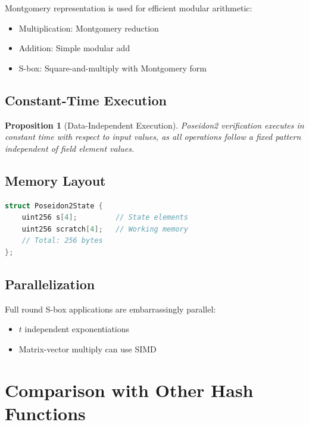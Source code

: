 \documentclass[11pt,a4paper]{article}
\newtheorem{proposition}{Proposition}
\begin{document}
Montgomery representation is used for efficient modular arithmetic:

\begin{itemize}
    \item Multiplication: Montgomery reduction
    \item Addition: Simple modular add
    \item S-box: Square-and-multiply with Montgomery form
\end{itemize}

\subsection{Constant-Time Execution}

\begin{proposition}[Data-Independent Execution]
Poseidon2 verification executes in constant time with respect to input values, as all operations follow a fixed pattern independent of field element values.
\end{proposition}

\subsection{Memory Layout}

\begin{lstlisting}[language=C, caption={Memory layout for t=4}]
struct Poseidon2State {
    uint256 s[4];         // State elements
    uint256 scratch[4];   // Working memory
    // Total: 256 bytes
};
\end{lstlisting}

\subsection{Parallelization}

Full round S-box applications are embarrassingly parallel:
\begin{itemize}
    \item $t$ independent exponentiations
    \item Matrix-vector multiply can use SIMD
\end{itemize}

\section{Comparison with Other Hash Functions}
\end{document}
